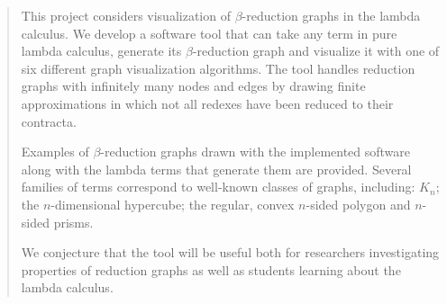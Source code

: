 
\begin{abstract}

This project considers visualization of $\beta$-reduction graphs in the lambda
calculus. We develop a software tool that can take any term in pure lambda
calculus, generate its $\beta$-reduction graph and visualize it with one of
six different graph visualization algorithms. The tool handles reduction
graphs with infinitely many nodes and edges by drawing finite approximations
in which not all redexes have been reduced to their contracta. 

Examples of $\beta$-reduction graphs drawn with the implemented software along
with the lambda terms that generate them are provided. Several families of
terms correspond to well-known classes of graphs, including: $K_n$; the
$n$-dimensional hypercube; the regular, convex $n$-sided polygon and $n$-sided
prisms.

We conjecture that the tool will be useful both for researchers investigating
properties of reduction graphs as well as students learning about the lambda
calculus.

\end{abstract}
